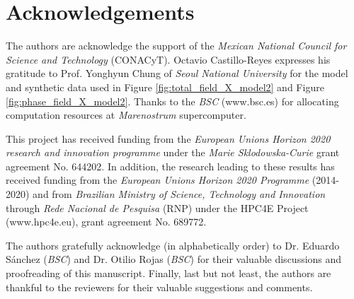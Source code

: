 \documentclass[review]{elsarticle}
\begin{document}
\section{Acknowledgements}
The authors are acknowledge the support of the \textit{Mexican National Council for Science and Technology} (CONACyT). Octavio Castillo-Reyes expresses his gratitude to Prof. Yonghyun Chung of \textit{Seoul National University} for the model and synthetic data used in Figure \ref{fig:total_field_X_model2} and Figure \ref{fig:phase_field_X_model2}. Thanks to the \textit{BSC} (www.bsc.es) for allocating computation resources at \textit{Marenostrum} supercomputer. 

This project has received funding from the \textit{European Union\textquotesingle s Horizon 2020 research and innovation programme} under the \textit{Marie Sklodowska-Curie} grant agreement No. 644202. In addition, the research leading to these results has received funding from the \textit{European Union\textquotesingle s Horizon 2020 Programme} (2014-2020) and from \textit{Brazilian Ministry of Science, Technology and Innovation} through \textit{Rede Nacional de Pesquisa} (RNP) under the HPC4E Project (www.hpc4e.eu), grant agreement No. 689772.

The authors gratefully acknowledge (in alphabetically order) to Dr. Eduardo S\'anchez (\textit{BSC}) and Dr. Otilio Rojas (\textit{BSC}) for their valuable discussions and proofreading of this manuscript. Finally, last but not least, the authors are thankful to the reviewers for their valuable suggestions and comments.

\appendix
\end{document}
